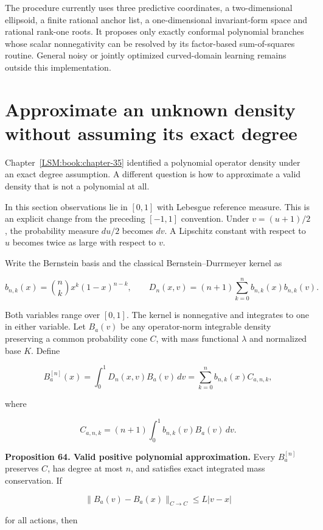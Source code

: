 The procedure currently uses three predictive coordinates, a
two-dimensional ellipsoid, a finite rational anchor list, a
one-dimensional invariant-form space and rational rank-one roots. It
proposes only exactly conformal polynomial branches whose scalar
nonnegativity can be resolved by its factor-based sum-of-squares
routine. General noisy or jointly optimized curved-domain learning
remains outside this implementation.

\section{Approximate an unknown density without assuming its exact degree}\label{LSM:approximate-an-unknown-density-without-assuming-its-exact-degree}

Chapter~\ref{LSM:book:chapter-35} identified a polynomial operator density under an exact degree
assumption. A different question is how to approximate a valid density
that is not a polynomial at all.

In this section observations lie in \([0,1]\) with Lebesgue reference
measure. This is an explicit change from the preceding \([-1,1]\)
convention. Under \(v=(u+1)/2\), the probability measure \(du/2\)
becomes \(dv\). A Lipschitz constant with respect to \(u\) becomes twice
as large with respect to \(v\).

Write the Bernstein basis and the classical Bernstein--Durrmeyer kernel
as

\[
b_{n,k}(x)=\binom nk x^k(1-x)^{n-k},\qquad
D_n(x,v)=(n+1)\sum_{k=0}^n b_{n,k}(x)b_{n,k}(v).
\]

Both variables range over \([0,1]\). The kernel is nonnegative and
integrates to one in either variable. Let \(B_a(v)\) be any
operator-norm integrable density preserving a common probability cone
\(C\), with mass functional \(\lambda\) and normalized base \(K\).
Define

\[
B_a^{[n]}(x)=\int_0^1D_n(x,v)B_a(v)\,dv
=\sum_{k=0}^n b_{n,k}(x)C_{a,n,k},
\]

where

\[
C_{a,n,k}=(n+1)\int_0^1b_{n,k}(v)B_a(v)\,dv.
\]

\textbf{Proposition 64. Valid positive polynomial approximation.} Every
\(B_a^{[n]}\) preserves \(C\), has degree at most \(n\), and satisfies
exact integrated mass conservation. If

\[
\|B_a(v)-B_a(x)\|_{C\to C}\leq L|v-x|
\]

for all actions, then

